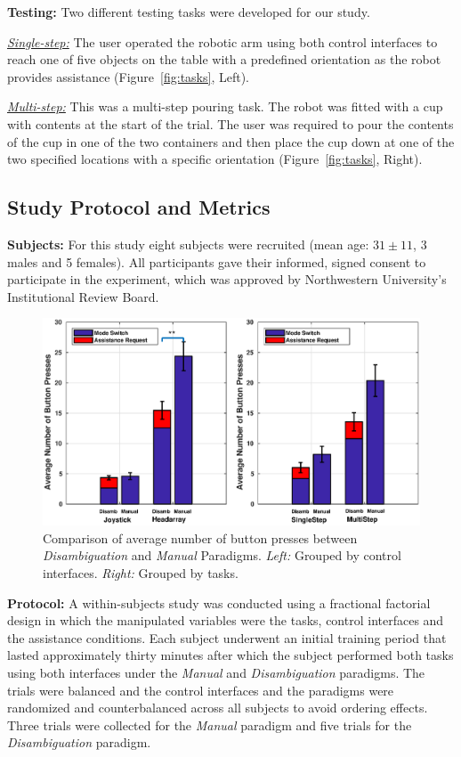 \noindent\textbf{Testing:} Two different testing tasks were developed for our study. 

\noindent\underline{\textit{Single-step:}} The user operated the robotic arm using both control interfaces to reach one of five objects on the table with a predefined orientation as the robot provides assistance (Figure~\ref{fig:tasks}, Left). 

\noindent\underline{\textit{Multi-step:}} This was a multi-step pouring task. The robot was fitted with a cup with contents at the start of the trial. The user was required to pour the contents of the cup in one of the two containers and then place the cup down at one of the two specified locations with a specific orientation (Figure~\ref{fig:tasks}, Right). 

\subsection{Study Protocol and Metrics}
\noindent\textbf{Subjects:} For this study eight subjects were recruited (mean age: $31 \pm 11$, 3 males and 5 females). All participants gave their informed, signed consent to participate in the experiment, which was approved by Northwestern University's Institutional Review Board. 
\begin{figure}[ht!]
	\centering
	\includegraphics[keepaspectratio, width = 1\hsize ,center]{./figures/button_press_combined_shrunk.eps}
	\caption{Comparison of average number of button presses between \textit{Disambiguation} and \textit{Manual} Paradigms. \textit{Left:} Grouped by control interfaces. \textit{Right:} Grouped by tasks.}
	\label{fig:button_press}
\end{figure}
\noindent\textbf{Protocol:}
A within-subjects study was conducted using a fractional factorial design in which the manipulated variables were the tasks, control interfaces and the assistance conditions. Each subject underwent an initial training period that lasted approximately thirty minutes after which the subject performed both tasks using both interfaces under the \textit{Manual} and \textit{Disambiguation} paradigms. The trials were balanced and the control interfaces and the paradigms were randomized and counterbalanced across all subjects to avoid ordering effects. Three trials were collected for the \textit{Manual} paradigm and five trials for the \textit{Disambiguation} paradigm. 

